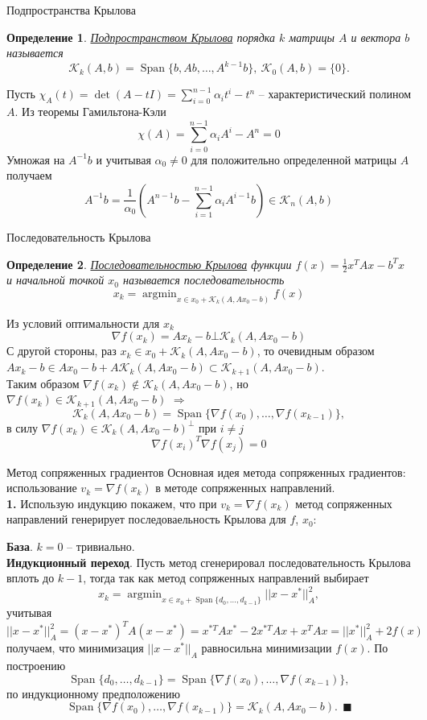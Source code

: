 \documentclass[10pt]{beamer}
\DeclareMathOperator{\argmin}{argmin}
\DeclareMathOperator{\lin}{Span}
\newcounter{def}
\newtheorem{definition_ru}{Определение}[def]
\begin{document}
\begin{frame}{Подпространства Крылова}
\begin{definition_ru}
\underline{Подпространством Крылова} порядка $k$ матрицы $A$ и вектора $b$ называется
$$
\mathcal{K}_k(A, b)=\lin\{b, Ab, \ldots, A^{k-1}b\}, ~\mathcal{K}_0(A, b)=\{0\}. 
$$
\end{definition_ru}
\pause
Пусть $\chi_A(t)=\det(A-tI)=\sum_{i=0}^{n-1}\alpha_it^i-t^n$ -- характеристический полином $A$. Из теоремы Гамильтона-Кэли
$$
\chi(A)=\sum_{i=0}^{n-1}\alpha_iA^i-A^n=0
$$
\pause
Умножая на $A^{-1}b$ и учитывая $\alpha_0\neq 0$ для положительно определенной матрицы $A$ получаем
$$
A^{-1}b=\frac{1}{\alpha_0}\left(A^{n-1}b-\sum_{i=1}^{n-1}\alpha_iA^{i-1}b\right)\in\mathcal{K}_n(A, b)
$$
\end{frame}

\begin{frame}{Последовательность Крылова}
\begin{definition_ru}
\underline{Последовательностью Крылова} функции $f(x)=\frac{1}{2}x^TAx-b^Tx$ и начальной точкой $x_0$ называется последовательность
$$
x_k=\argmin_{x\in x_0+\mathcal{K}_k(A, Ax_0-b)}f(x)
$$
\end{definition_ru}
\pause
Из условий оптимальности для $x_k$
$$
\nabla f(x_k)=Ax_k-b \bot \mathcal{K}_k(A, Ax_0-b)
$$
С другой стороны, раз $x_k\in x_0+\mathcal{K}_k(A, Ax_0-b)$, то очевидным образом 
$Ax_k-b\in Ax_0-b+A\mathcal{K}_{k}(A,Ax_0-b)\subset \mathcal{K}_{k+1}(A, Ax_0-b)$.\\
\pause
\vspace{1em}
Таким образом $\nabla f(x_k)\notin \mathcal{K}_k(A,Ax_0-b)$, но $\nabla f(x_k)\in \mathcal{K}_{k+1}(A, Ax_0-b)$ $\Rightarrow$
$$
\mathcal{K}_k(A, Ax_0-b)=\lin\{\nabla f(x_0), \ldots, \nabla f(x_{k-1})\},
$$
в силу $\nabla f(x_k)\in\mathcal{K}_k(A,Ax_0-b)^\bot$ при $i\neq j$
$$
\nabla f(x_i)^T\nabla f(x_j)=0
$$
\end{frame}

\begin{frame}{Метод сопряженных градиентов}
Основная идея метода сопряженных градиентов: использование $v_k=\nabla f(x_k)$ в методе сопряженных направлений. \\
\pause
\vspace{1em}
\textbf{1.} Использую индукцию покажем, что при $v_k=\nabla f(x_k)$ 
метод сопряженных  направлений генерирует последоваельность Крылова для $f$, $x_0$: 

\textbf{База}. $k=0$ -- тривиально.\\

\textbf{Индукционный переход}. Пусть метод сгенерировал последовательность Крылова вплоть до $k-1$, тогда
так как метод сопряженных направлений выбирает 
$$
x_k=\argmin_{x\in x_0+\lin\{d_0, \ldots, d_{k-1}\}}||x-x^*||_A^2,
$$
учитывая 
$$
||x-x^*||_A^2=(x-x^*)^TA(x-x^*)=x^{*T}Ax^*-2x^{*T}Ax+x^TAx=||x^*||_A^2+2f(x)
$$
получаем, что минимизация $||x-x^*||_A$ равносильна минимизации $f(x)$. По построению
$$
\lin\{d_0, \ldots, d_{k-1}\}=\lin\{\nabla f(x_0), \ldots, \nabla f(x_{k-1})\},
$$ по
индукционному предположению 
$$\lin\{\nabla f(x_0), \ldots, \nabla f(x_{k-1})\}=\mathcal{K}_k(A, Ax_0-b).~~\blacksquare
$$

\end{frame}
\end{document}
